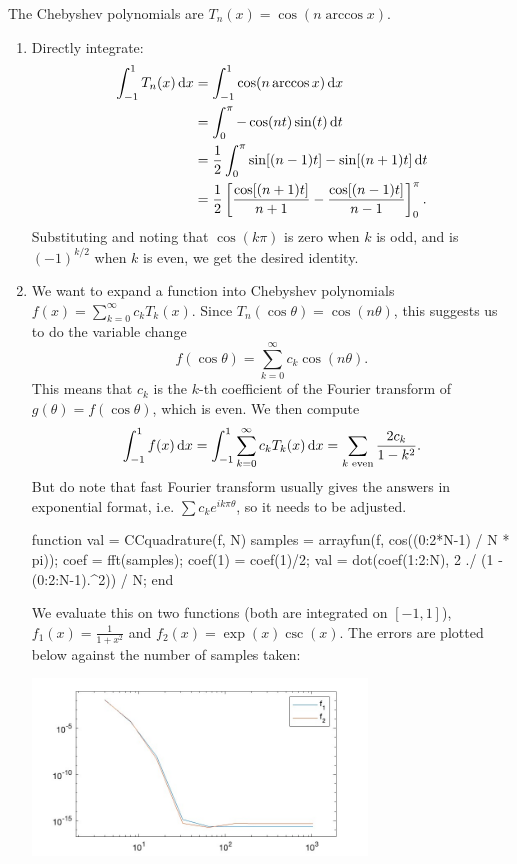 \documentclass{homework}
\begin{document}
\begin{problem} The Chebyshev polynomials are \(T_n(x) = \cos(n\arccos x)\).
\begin{enumerate}[label=(\roman*)]
\item Directly integrate:
\begin{align*}
\int_{-1}^1 T_n(x) \d[x] &= \int_{-1}^1 \cos (n \arccos x) \d[x]\\
&= \int_{0}^{\pi} - \cos(nt)\sin(t) \d[t]\\
&= \frac12\int_0^\pi \sin[(n-1)t] - \sin[(n+1)t] \d[t]\\
&= \frac12\left[ \frac{\cos[(n+1)t]}{n+1} - \frac{\cos[(n-1)t]}{n-1} \right]_{0}^\pi.
\end{align*}
Substituting and noting that \(\cos(k\pi)\) is zero when \(k\) is odd, and is \((-1)^{k/2}\) when \(k\) is even, we get the desired identity.
\item We want to expand a function into Chebyshev polynomials \(f(x) = \sum_{k=0}^\infty c_k T_k(x)\). Since \(T_n(\cos \theta) = \cos(n \theta)\), this suggests us to do the variable change
\[f(\cos\theta) = \sum_{k=0}^\infty c_k \cos(n\theta).\]
This means that \(c_k\) is the \(k\)-th coefficient of the Fourier transform of \(g(\theta) = f(\cos\theta)\), which is even. We then compute
\[\int_{-1}^1 f(x) \d[x] = \int_{-1}^1 \sum_{k=0}^\infty c_k T_k(x) \d[x] = \sum_{\text{\(k\) even}} \frac{2c_k}{1-k^2}.\]
But do note that fast Fourier transform usually gives the answers in exponential format, i.e. \(\sum c_k e^{ik\pi\theta}\), so it needs to be adjusted.
\begin{matlab}
function val = CCquadrature(f, N)
  samples = arrayfun(f, cos((0:2*N-1) / N * pi));
  coef = fft(samples);
  coef(1) = coef(1)/2;
  val = dot(coef(1:2:N), 2 ./ (1 - (0:2:N-1).^2)) / N;
end
\end{matlab}
We evaluate this on two functions (both are integrated on \([-1,1]\)), \(f_1(x) = \frac1{1+x^2}\) and \(f_2(x) = \exp(x)\csc(x)\). The errors are plotted below against the number of samples taken:
\begin{center}
\includegraphics[width=0.7\textwidth]{Hw5-Fig1.jpg}

\end{center}
\end{enumerate}
\end{problem}
\end{document}
